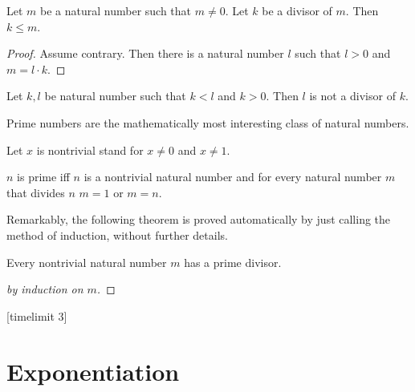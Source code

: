 \documentclass{article}
\begin{document}
\begin{forthel}
\begin{lemma}
Let $m$ be a natural number such that $m \neq 0$.
Let $k$ be a divisor of $m$.
Then $k \leq m$.
\end{lemma}
\begin{proof}
Assume contrary.
Then there is a natural number $l$ such that
$l > 0$ and $m = l \cdot k$.
\end{proof}

\begin{proposition}
Let $k,l$ be natural number such that $k < l$ and $k > 0$.
Then $l$ is not a divisor of $k$.
\end{proposition}

\end{forthel}
%
Prime numbers are the mathematically most interesting
class of natural numbers.
%
\begin{forthel}
Let $x$ is nontrivial stand for $x \neq 0$ and $x \neq 1$.

\begin{definition}
$n$ is prime iff $n$ is a nontrivial natural number and
for every natural number $m$ that divides $n$ $m = 1$ or $m = n$.
\end{definition}
\end{forthel}
%
Remarkably, the following theorem is proved automatically by
just calling the method of induction, without further details.  
%
\begin{forthel}
[timelimit 10]
\begin{theorem}
Every nontrivial natural number $m$ has a prime divisor.
\end{theorem}
\begin{proof}[by induction on $m$]
\end{proof}
[timelimit 3]
\end{forthel}


\section{Exponentiation}
\end{document}
